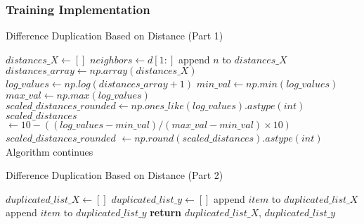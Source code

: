 \documentclass[a4paper, 12pt]{report}
\begin{document}
\subsubsection{Training Implementation}
\begin{algorithm}[H]
    \caption{Difference Duplication Based on Distance (Part 1)}
    \label{alg:duplication_Implementation_based_on_distance_train_part1}
    \begin{algorithmic}[1]
            \State $distances\_X \gets []$
                \State $neighbors \gets d[1:]$
                    \State append $n$ to $distances\_X$
                \EndFor
            \EndFor
            \State $distances\_array \gets np.array(distances\_X)$
            \State $log\_values \gets np.log(distances\_array + 1)$
            \State $min\_val \gets np.min(log\_values)$
            \State $max\_val \gets np.max(log\_values)$
                \State $scaled\_distances\_rounded \gets np.ones\_like(log\_values).astype(int)$
            \Else
                \State $scaled\_distances$ $\gets 10 - ((log\_values - min\_val) / (max\_val - min\_val) \times 10)$
                \State $scaled\_distances\_rounded$ $\gets np.round(scaled\_distances).astype(int)$
            \EndIf
            \State Algorithm continues 
        \EndFunction
    \end{algorithmic}
\end{algorithm}
\clearpage

\begin{algorithm}[H]
    \caption{Difference Duplication Based on Distance (Part 2)}
    \label{alg:duplication_Implementation_based_on_distance_train_part2}
    \begin{algorithmic}[1] 
            \State $duplicated\_list\_X \gets []$
            \State $duplicated\_list\_y \gets []$
                    \State append $item$ to $duplicated\_list\_X$
                \EndFor
            \EndFor
                    \State append $item$ to $duplicated\_list\_y$
                \EndFor
            \EndFor
            \State \textbf{return} $duplicated\_list\_X$, $duplicated\_list\_y$
        \EndFunction
    \end{algorithmic}
\end{algorithm}
\clearpage
\end{document}

